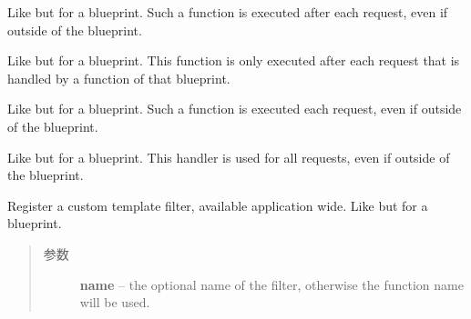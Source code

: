 \documentclass[a4paper,12pt]{sphinxmanual}
\begin{document}
\begin{fulllineitems}
\begin{fulllineitems}
\label{api:flask.Blueprint.after_app_request}
Like {\hyperref[api:flask.Flask.after_request]{}} but for a blueprint.  Such a function
is executed after each request, even if outside of the blueprint.

\end{fulllineitems}


\begin{fulllineitems}
\label{api:flask.Blueprint.after_request}
Like {\hyperref[api:flask.Flask.after_request]{}} but for a blueprint.  This function
is only executed after each request that is handled by a function of
that blueprint.

\end{fulllineitems}


\begin{fulllineitems}
\label{api:flask.Blueprint.app_context_processor}
Like {\hyperref[api:flask.Flask.context_processor]{}} but for a blueprint.  Such a
function is executed each request, even if outside of the blueprint.

\end{fulllineitems}


\begin{fulllineitems}
\label{api:flask.Blueprint.app_errorhandler}
Like {\hyperref[api:flask.Flask.errorhandler]{}} but for a blueprint.  This
handler is used for all requests, even if outside of the blueprint.

\end{fulllineitems}


\begin{fulllineitems}
\label{api:flask.Blueprint.app_template_filter}
Register a custom template filter, available application wide.  Like
{\hyperref[api:flask.Flask.template_filter]{}} but for a blueprint.
\begin{quote}\begin{description}
\item[{参数}] \leavevmode
\textbf{name} -- the optional name of the filter, otherwise the
function name will be used.


\end{description}
\end{quote}
\end{fulllineitems}
\end{fulllineitems}
\end{document}
